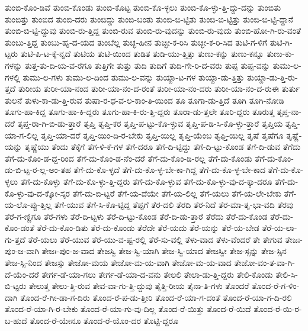{ತುಂಬಿ-ಕೊಂ-ಡಿವೆ
ತುಂಬಿ-ಕೊಂಡು
ತುಂಬಿ-ಕೊಟ್ಟ
ತುಂಬಿ-ಕೊ-ಳ್ಳಲು
ತುಂಬಿ-ಕೊ-ಳ್ಳು-ತ್ತಿ-ದ್ದು-ದನ್ನು
ತುಂಬಿತು
ತುಂಬಿತ್ತು
ತುಂಬಿದ
ತುಂಬಿ-ದರು
ತುಂಬಿದ್ದು
ತುಂಬಿ-ಬಂತು
ತುಂಬಿ-ಬಿ-ಟ್ಟಿತು
ತುಂಬಿ-ಬಿ-ಟ್ಟಿತ್ತು
ತುಂಬಿ-ಬಿ-ಟ್ಟಿ-ದ್ದಾನೆ
ತುಂಬಿ-ಬಿ-ಟ್ಟಿ-ದ್ದುವು
ತುಂಬಿ-ರು-ತ್ತಿದ್ದ
ತುಂಬಿ-ರುವ
ತುಂಬಿ-ರು-ವುದನ್ನು
ತುಂಬಿ-ರು-ವುದು
ತುಂಬಿ-ಹೋ-ಗಿ-ರು-ವಂತೆ
ತುಂಬು-ತ್ತಿದ್ದ
ತುಂಬು-ಹೃ-ದ-ಯದ
ತುಂಬೆಲ್ಲ
ತುಚ್ಛ-ಹೀನ
ತುಚ್ಛೀ-ಕ-ರಿಸಿ
ತುಚ್ಛೀ-ಕ-ರಿ-ಸಿದ
ತುಟಿ-ಗ-ಳಿಗೆ
ತುಟಿ-ಗಿ-ಟ್ಟರು
ತುಟಿ-ಪಿ-ಟ-ಕ್ಕೆ-ನ್ನದೆ
ತುಟಿಯ
ತುಟಿ-ಯಿಂದ
ತುಡಿತ
ತುಡಿ-ಯು-ತ್ತಿತ್ತು
ತುಣು-ಕನ್ನು
ತುಣು-ಕನ್ನೂ
ತುಣು-ಕು-ಗಳನ್ನು
ತುತ್ತ-ತು-ದಿ-ಯ-ವ-ರೆಗೂ
ತುತ್ತಿಗೇ
ತುತ್ತು
ತುದಿ
ತುದಿಗೆ
ತುದಿ-ಗೇ-ರಿ-ದ-ವರು
ತುಪ್ಪ
ತುಪ್ಪ-ವನ್ನು
ತುಮು-ಲ-ಗಳಲ್ಲಿ
ತುಮು-ಲ-ಗಳು
ತುಮು-ಲ-ದಿಂದ
ತುಮು-ಲ-ವನ್ನು
ತುಯ್ದಾ-ಟ-ಗಳ
ತುಯ್ದಾ-ಡು-ತ್ತಿತ್ತು
ತುಯ್ದಾ-ಡು-ತ್ತಿ-ರು-ತ್ತದೆ
ತುರೀಯ
ತುರೀ-ಯಾ-ನಂದ
ತುರೀ-ಯಾ-ನಂ-ದ-ರಂತೆ
ತುರೀ-ಯಾ-ನಂ-ದರು
ತುರೀ-ಯಾ-ನಂ-ದ-ರುಈ
ತುರ್ತು
ತುಲನೆ
ತುಳು-ಕಾ-ಡು-ತ್ತಿ-ರುವ
ತುಷಾ-ರ-ಧ-ವ-ಲ-ಕಾಂ-ತಿ-ಯಿಂದ
ತೂ
ತೂಗಾ-ಡು-ತ್ತಿದೆ
ತೂಗಿ
ತೂಗಿ-ನೋಡಿ
ತೂಗು-ಹಾ-ಕಿದ್ದ
ತೂಗು-ಹಾ-ಕಿ-ದ್ದರು
ತೂಗು-ಹಾ-ಕಿ-ರು-ತ್ತಿ-ದ್ದರು
ತೂರಾ-ಡು-ತ್ತಲೇ
ತೂರಿ-ದ್ದರು
ತೂರುತ್ತ
ತೃಪ್ತ-ನಾ-ದರೆ
ತೃಪ್ತ-ರಾ-ಗಿ-ಬಿ-ಡು-ತ್ತಾರೆ
ತೃಪ್ತಿ
ತೃಪ್ತಿ-ಕರ
ತೃಪ್ತಿ-ಪ-ಟ್ಟು-ಕೊ-ಳ್ಳುವ
ತೃಪ್ತಿ-ಪ-ಡಿ-ಸಿ-ಕೊ-ಳ್ಳು-ತ್ತಾರೆ
ತೃಪ್ತಿಯ
ತೃಪ್ತಿ-ಯಾ-ಗ-ಲಿಲ್ಲ
ತೃಪ್ತಿ-ಯಾ-ದರೆ
ತೃಪ್ತಿ-ಯಿಂ-ದಿ-ರ-ಬೇಕು
ತೃಪ್ತಿ-ಯಿಲ್ಲ
ತೃಪ್ತಿ-ಯೆಂಬ
ತೃಫ್ತಿ-ಯಿಲ್ಲ
ತೃಷೆ
ತೃಷೆಗೂ
ತೃಷ್ಣೆ-ಯನ್ನು
ತೃಷ್ಣೆಯು
ತೆಂದು
ತೆಕ್ಕೆಗೆ
ತೆಗ-ಳಿ-ಕೆ-ಗಳ
ತೆಗೆ-ದರೂ
ತೆಗೆ-ದಿ-ಟ್ಟಿದ್ದು
ತೆಗೆ-ದಿ-ಟ್ಟು-ಕೊಂಡ
ತೆಗೆ-ದಿ-ಡುವ
ತೆಗೆದು
ತೆಗೆ-ದು-ಕೊಂ-ಡ-ದ್ದ-ರಿಂದ
ತೆಗೆ-ದು-ಕೊಂ-ಡ-ನೆಂ-ದರೆ
ತೆಗೆ-ದು-ಕೊಂ-ಡಿ-ರಲ್ಲ
ತೆಗೆ-ದು-ಕೊಂಡು
ತೆಗೆ-ದು-ಕೊಂ-ಡು-ಬಿ-ಟ್ಟ-ರ-ಲ್ಲ-ಅಂ-ತಹ
ತೆಗೆ-ದು-ಕೊ-ಳ್ಳದೆ
ತೆಗೆ-ದು-ಕೊ-ಳ್ಳ-ಬೇ-ಕಾ-ಗಿದ್ದ
ತೆಗೆ-ದು-ಕೊ-ಳ್ಳ-ಬೇ-ಕಾದ
ತೆಗೆ-ದು-ಕೊ-ಳ್ಳಲು
ತೆಗೆ-ದು-ಕೊಳ್ಳು
ತೆಗೆ-ದು-ಕೊ-ಳ್ಳು-ತ್ತಿ-ದ್ದರು
ತೆಗೆ-ದು-ಕೊ-ಳ್ಳುವ
ತೆಗೆ-ದು-ಕೊ-ಳ್ಳು-ವು-ದ-ಕ್ಕಾ-ದರೂ
ತೆಗೆ-ದು-ಕೊ-ಳ್ಳು-ವು-ದ-ಕ್ಕೋ-ಸ್ಕರ
ತೆಗೆ-ದು-ಬಿ-ಟ್ಟರೆ
ತೆಗೆ-ಯ-ದೆಯೇ
ತೆಗೆ-ಯ-ಲಿಲ್ಲ
ತೆಗೆ-ಯಲು
ತೆಗೆ-ಯ-ಲೇ-ಬೇಕು
ತೆಗೆ-ಯ-ಲೊ-ಪ್ಪು-ತ್ತಿಲ್ಲ
ತೆಗೆ-ಯುವ
ತೆಗೆ-ಸಿ-ಕೊ-ಟ್ಟಿದ್ದ
ತೆಪ್ಪಗೆ
ತೆರ-ದಲಿ
ತೆರದಿ
ತೆರ-ನಿದೆ
ತೆರ-ಮಾ-ತೃ-ಭಾ-ವದಿ
ತೆರವು
ತೆರೆ-ಗ-ಣ್ಣಿಗೂ
ತೆರೆ-ಗಳು
ತೆರೆ-ದಿ-ಟ್ಟಳು
ತೆರೆ-ದಿ-ಟ್ಟು-ಕೊಂಡ
ತೆರೆ-ದಿ-ಡು-ತ್ತಾರೆ
ತೆರೆದು
ತೆರೆ-ದು-ಕೊಂಡ
ತೆರೆ-ದು-ಕೊಂ-ಡಂತೆ
ತೆರೆ-ದು-ಕೊಂ-ಡಿತು
ತೆರೆ-ದು-ಕೊಂಡು
ತೆರೆದೇ
ತೆರೆ-ಯದು
ತೆರೆ-ಯನ್ನು
ತೆರೆ-ಯ-ಬೇಡ
ತೆರೆ-ಯ-ಲಾ-ಗು-ತ್ತದೆ
ತೆರೆ-ಯಲು
ತೆರೆ-ಯುವ
ತೆರೆ-ಯು-ವ-ಷ್ಟ-ರಲ್ಲಿ
ತೆರೆ-ಸು-ವಲ್ಲಿ
ತೆಳು-ವಾದ
ತೆಳು-ವೆಂದರೆ
ತೇ
ತೇಗುವ
ತೇಜಃ-ಪುಂ-ಜ-ವಾಗಿ
ತೇಜಃ-ಪುಂ-ಜ-ವಾದ
ತೇಜಸ್ವಿ
ತೇಜ-ಸ್ವಿ-ಯಾಗಿ
ತೇಜ-ಸ್ವಿ-ಯಾದ
ತೇಜಸ್ವೀ
ತೇಜ-ಸ್ಸನ್ನು
ತೇಜ-ಸ್ಸಿನ
ತೇಜ-ಸ್ಸಿ-ನಿಂದ
ತೇಜಸ್ಸು
ತೇಜೋ-ಮಯ
ತೇಜೋ-ಮ-ಯ-ವಾಗಿ
ತೇಜೋ-ಮ-ಯ-ವಾದ
ತೇಜೋ-ವಂ-ತ-ವಾ-ಗಿ-ದೆ-ಯೆಂ-ದರೆ
ತೇರ್ಗ-ಡೆ-ಯಾ-ಗಲು
ತೇರ್ಗ-ಡೆ-ಯಾ-ದ-ವನು
ತೇಲಲಿ
ತೇಲಾ-ಡು-ತ್ತಿ-ದ್ದರು
ತೇಲಿ-ಕೊಂಡು
ತೇಲಿ-ಸಿ-ಬಿ-ಟ್ಟರು
ತೇಲುತ್ತ
ತೇಲು-ತ್ತಿ-ರುವ
ತೇವ-ವಾ-ಗು-ತ್ತಿ-ದ್ದುವು
ತೈತ್ತಿ-ರೀಯ
ತೈನಾ-ತಿ-ಗಳು
ತೊಂದರೆ
ತೊಂದ-ರೆ-ಗ-ಳಿಂ-ದಾಗಿ
ತೊಂದ-ರೆ-ಗೀ-ಡಾ-ಗ-ದಿರು
ತೊಂದ-ರೆ-ಪ-ಡು-ತ್ತೀರಿ
ತೊಂದ-ರೆ-ಯಾ-ಗ-ದಂತೆ
ತೊಂದ-ರೆ-ಯಾ-ಗ-ದಿ-ರಲಿ
ತೊಂದ-ರೆ-ಯಾ-ಗಿ-ರ-ಬೇಕು
ತೊಂದ-ರೆ-ಯಾ-ಗು-ವು-ದಿಲ್ಲ
ತೊಂದ-ರೆ-ಯಿತ್ತು
ತೊಂದ-ರೆ-ಯಿದೆ
ತೊಂದ-ರೆ-ಯಿ-ರ-ಬ-ಹುದೆ
ತೊಂದ-ರೆ-ಯೇನೂ
ತೊಂದ-ರೆ-ಯೊಂ-ದರ
ತೊಟ್ಟಿ-ದ್ದರೂ
}
